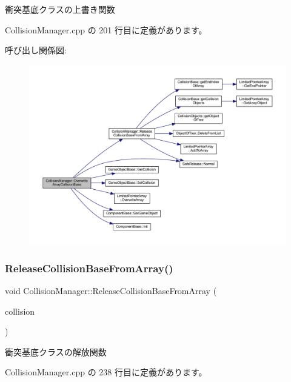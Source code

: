 衝突基底クラスの上書き関数 



 Collision\+Manager.\+cpp の 201 行目に定義があります。

呼び出し関係図\+:
\nopagebreak
\begin{figure}[H]
\begin{center}
\leavevmode
\includegraphics[width=350pt]{class_collision_manager_af9c2ce87e0189cdd1256c83decc64673_cgraph}
\end{center}
\end{figure}
\mbox{\label{class_collision_manager_a34318163f4256cebc7aefb95fc475030}} 
\subsubsection{\texorpdfstring{Release\+Collision\+Base\+From\+Array()}{ReleaseCollisionBaseFromArray()}}
{\footnotesize\ttfamily void Collision\+Manager\+::\+Release\+Collision\+Base\+From\+Array (\begin{DoxyParamCaption}\item[{\mbox{\hyperlink{class_collision_base}{Collision\+Base}} $\ast$}]{collision }\end{DoxyParamCaption})}



衝突基底クラスの解放関数 



 Collision\+Manager.\+cpp の 238 行目に定義があります。

